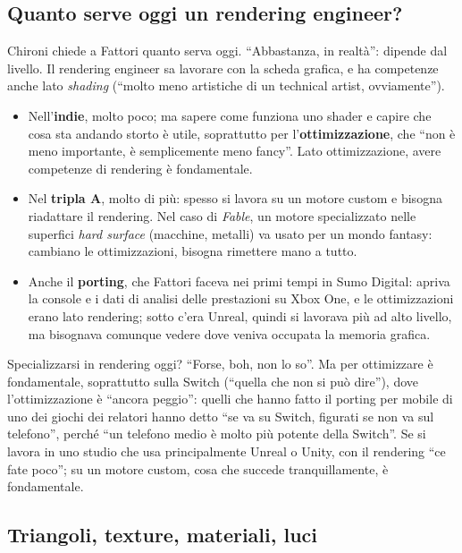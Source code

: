 \subsection{Quanto serve oggi un rendering engineer?}

Chironi chiede a Fattori quanto serva oggi. ``Abbastanza, in realtà'':
dipende dal livello. Il rendering engineer sa lavorare con la scheda grafica,
e ha competenze anche lato \emph{shading} (``molto meno artistiche di un
technical artist, ovviamente'').
\begin{itemize}
  \item Nell'\textbf{indie}, molto poco; ma sapere come funziona uno shader e
        capire che cosa sta andando storto è utile, soprattutto per
        l'\textbf{ottimizzazione}, che ``non è meno importante, è
        semplicemente meno fancy''. Lato ottimizzazione, avere competenze di
        rendering è fondamentale.
  \item Nel \textbf{tripla A}, molto di più: spesso si lavora su un motore
        custom e bisogna riadattare il rendering. Nel caso di \emph{Fable}, un
        motore specializzato nelle superfici \emph{hard surface} (macchine,
        metalli) va usato per un mondo fantasy: cambiano le ottimizzazioni,
        bisogna rimettere mano a tutto.
  \item Anche il \textbf{porting}, che Fattori faceva nei primi tempi in Sumo
        Digital: apriva la console e i dati di analisi delle prestazioni su
        Xbox One, e le ottimizzazioni erano lato rendering; sotto c'era
        Unreal, quindi si lavorava più ad alto livello, ma bisognava comunque
        vedere dove veniva occupata la memoria grafica.
\end{itemize}
Specializzarsi in rendering oggi? ``Forse, boh, non lo so''. Ma per ottimizzare
è fondamentale, soprattutto sulla Switch (``quella che non si può dire''),
dove l'ottimizzazione è ``ancora peggio'': quelli che hanno fatto il porting
per mobile di uno dei giochi dei relatori hanno detto ``se va su Switch,
figurati se non va sul telefono'', perché ``un telefono medio è molto più
potente della Switch''. Se si lavora in uno studio che usa principalmente
Unreal o Unity, con il rendering ``ce fate poco''; su un motore custom, cosa
che succede tranquillamente, è fondamentale.

\subsection{Triangoli, texture, materiali, luci}

